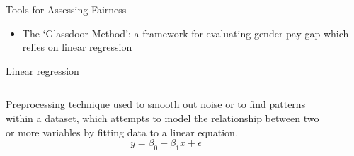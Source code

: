 \documentclass[usenames,dvipsnames]{beamer}
\begin{document}
    
    \begin{frame}{Tools for Assessing Fairness}
        \begin{itemize}
            \item \alert{The `Glassdoor Method'}: a framework for evaluating gender pay gap which relies on \textcolor{defaultBlue}{linear regression} \emph{\parencite{chamberlain2017analyze}}
        \end{itemize}
        \begin{block}{Linear regression}
            \begin{columns}
                \begin{column}{0.4715\textwidth}
                    Preprocessing technique used to smooth out noise or to find patterns within a dataset, which attempts to model the relationship between two or more variables by fitting data to a linear equation. \[y = \beta_0 + \beta_1x + \epsilon\]
                \end{column}
                \begin{column}{0.4715\textwidth}
                    \begin{center}
                        \begin{figure}
                        \end{figure}
                    \end{center}
                \end{column}
            \end{columns}
        \end{block}
    \end{frame}
    
\end{document}
